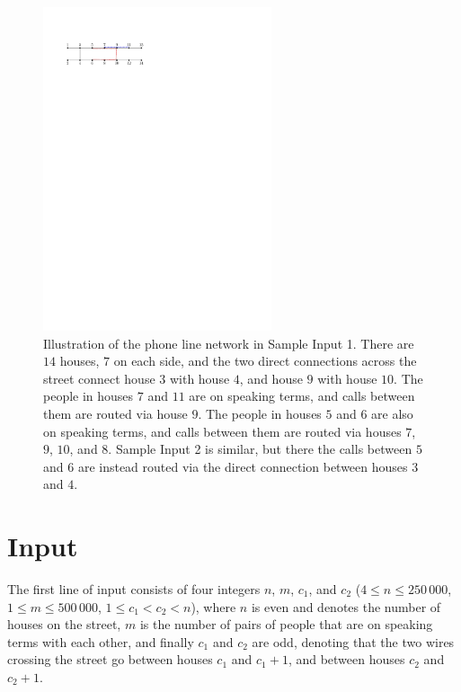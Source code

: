 \begin{figure}[!h]
  \centering
  \includegraphics[width=0.6\textwidth]{sample}
  \caption{Illustration of the phone line network in Sample Input 1.
    There are $14$ houses, $7$ on each side, and the two direct
    connections across the street connect house $3$ with house $4$,
    and house $9$ with house $10$.  The people in houses $7$ and $11$
    are on speaking terms, and calls between them are routed via house
    $9$.  The people in houses $5$ and $6$ are also on speaking terms,
    and calls between them are routed via houses $7$, $9$, $10$, and
    $8$.  Sample Input 2 is similar, but there the calls between $5$
    and $6$ are instead routed via the direct connection between
    houses $3$ and $4$.}
 \label{fig:surveillance sample}
\end{figure}

\section*{Input}

The first line of input consists of four integers $n$, $m$, $c_1$, and
$c_2$ ($4 \le n \le 250\,000$, $1 \le m \le 500\,000$, $1 \le c_1
< c_2 < n$), where $n$ is even and denotes the number of houses
on the street, $m$ is the number of pairs of people that are on
speaking terms with each other, and finally $c_1$ and $c_2$ are odd,
denoting that the two wires crossing the street go between houses
$c_1$ and $c_1+1$, and between houses $c_2$ and $c_2+1$.

